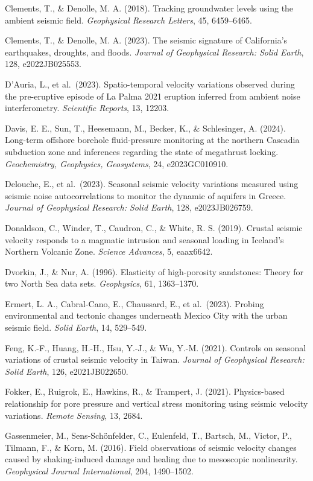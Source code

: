 \documentclass[12pt]{article}
\begin{document}
Clements, T., \& Denolle, M. A. (2018). Tracking groundwater levels
using the ambient seismic field. \emph{Geophysical Research Letters},
45, 6459--6465.

Clements, T., \& Denolle, M. A. (2023). The seismic signature of
California's earthquakes, droughts, and floods. \emph{Journal of
Geophysical Research: Solid Earth}, 128, e2022JB025553.

D'Auria, L., et al.~(2023). Spatio-temporal velocity variations observed
during the pre-eruptive episode of La Palma 2021 eruption inferred from
ambient noise interferometry. \emph{Scientific Reports}, 13, 12203.

Davis, E. E., Sun, T., Heesemann, M., Becker, K., \& Schlesinger, A.
(2024). Long-term offshore borehole fluid-pressure monitoring at the
northern Cascadia subduction zone and inferences regarding the state of
megathrust locking. \emph{Geochemistry, Geophysics, Geosystems}, 24,
e2023GC010910.

Delouche, E., et al.~(2023). Seasonal seismic velocity variations
measured using seismic noise autocorrelations to monitor the dynamic of
aquifers in Greece. \emph{Journal of Geophysical Research: Solid Earth},
128, e2023JB026759.

Donaldson, C., Winder, T., Caudron, C., \& White, R. S. (2019). Crustal
seismic velocity responds to a magmatic intrusion and seasonal loading
in Iceland's Northern Volcanic Zone. \emph{Science Advances}, 5,
eaax6642.

Dvorkin, J., \& Nur, A. (1996). Elasticity of high-porosity sandstones:
Theory for two North Sea data sets. \emph{Geophysics}, 61, 1363--1370.

Ermert, L. A., Cabral-Cano, E., Chaussard, E., et al.~(2023). Probing
environmental and tectonic changes underneath Mexico City with the urban
seismic field. \emph{Solid Earth}, 14, 529--549.

Feng, K.-F., Huang, H.-H., Hsu, Y.-J., \& Wu, Y.-M. (2021). Controls on
seasonal variations of crustal seismic velocity in Taiwan. \emph{Journal
of Geophysical Research: Solid Earth}, 126, e2021JB022650.

Fokker, E., Ruigrok, E., Hawkins, R., \& Trampert, J. (2021).
Physics-based relationship for pore pressure and vertical stress
monitoring using seismic velocity variations. \emph{Remote Sensing}, 13,
2684.

Gassenmeier, M., Sens-Schönfelder, C., Eulenfeld, T., Bartsch, M.,
Victor, P., Tilmann, F., \& Korn, M. (2016). Field observations of
seismic velocity changes caused by shaking-induced damage and healing
due to mesoscopic nonlinearity. \emph{Geophysical Journal
International}, 204, 1490--1502.
\end{document}
